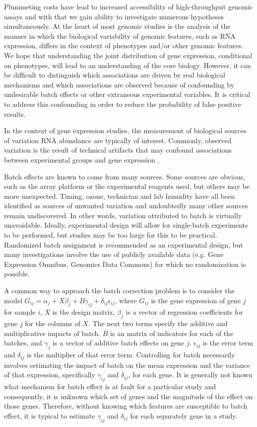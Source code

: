 Plummeting costs have lead to increased accessibility of high-throughput
genomic assays and with that we gain ability to investigate numerous
hypotheses simultaneously. At the heart of most genomic studies is
the analysis of the manner in which the biological variability of
genomic features, such as RNA expression, differs in the context of
phenotypes and/or other genomic features. We hope that understanding
the joint distribution of gene expression, conditional on phenotypes,
will lead to an understanding of the core biology. However, it can
be difficult to distinguish which associations are driven by real
biological mechanisms and which associations are observed because
of confounding by undesirable batch effects or other extraneous experimental
variables. It is critical to address this confounding in order to
reduce the probability of false positive results.

In the context of gene expression studies, the measurement of biological
sources of variation RNA abundance are typically of interest. Commonly,
observed variation is the result of technical artifacts that
may confound associations between experimental groups and gene expression
\cite{leek2010tackling,lander1999array}. 

Batch effects are known to come from many sources. Some sources are
obvious, such as the array platform or the experimental reagents used,
but others may be more unexpected. Timing, ozone\cite{fare2003effects},
technician and lab humidity have all been identified as sources of
unwanted variation and undoubtedly many other sources remain undiscovered\cite{scherer2009batch}.
In other words, variation attributed to batch is virtually unavoidable. Ideally,
experimental design will allow for single-batch experiments to be
performed, but studies may be too large for this to be practical.
Randomized batch assignment is recommended as an experimental design\cite{conesa2016survey},
but many investigations involve the use of publicly available data
(e.g. Gene Expression Omnibus, Genomics Data Commons) for which no
randomization is possible.

A common way to approach the batch correction problem is to consider
the model $G_{ij}=\alpha_{j}+X\beta_{j}+B\gamma_{ij}+\delta_{ij}\epsilon_{ij}$,
where $G_{ij}$ is the gene expression of gene $j$ for sample $i$,
$X$ is the design matrix, $\beta_{j}$ is a vector of regression
coefficients for gene $j$ for the columns of $X$. The next two terms
specify the additive and multiplicative impacts of batch. \textbf{$B$}
is an matrix of indicators for each of the batches, and $\gamma_{j}$
is a vector of additive batch effects on gene $j$. $\epsilon_{ij}$
is the error term and $\delta_{ij}$ is the multiplier of that error
term. Controlling for batch necessarily involves estimating the impact
of batch on the mean expression and the variance of that expression,
specifically $\gamma_{ij}$ and $\delta_{ij}$, for each gene. It
is generally not known what mechanism for batch effect is at fault
for a particular study and consequently, it is unknown which set of
genes and the magnitude of the effect on those genes. Therefore, without
knowing which features are susceptible to batch effect, it is typical
to estimate $\gamma_{ij}$ and $\delta_{ij}$ for each separately
gene in a study. 


